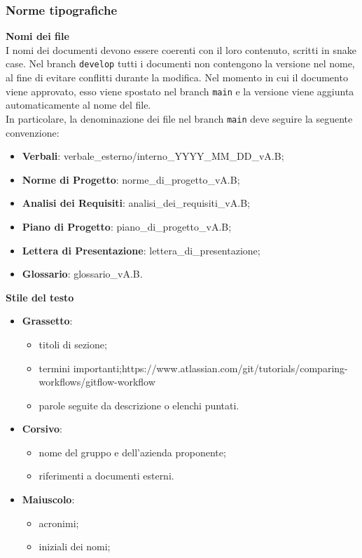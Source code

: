 \subsubsection{Norme tipografiche}
\textbf{Nomi dei file}\\ I nomi dei documenti devono essere coerenti con il loro contenuto,
scritti in snake case. Nel branch \texttt{develop} tutti i documenti non contengono la versione nel nome, al fine di evitare conflitti durante la modifica.
Nel momento in cui il documento viene approvato, esso viene spostato nel branch \texttt{main} e la versione viene aggiunta automaticamente al nome del file.\\
In particolare, la denominazione dei file nel branch \texttt{main} deve seguire la seguente convenzione:
\begin{itemize}
	\item \textbf{Verbali}: verbale\_esterno/interno\_YYYY\_MM\_DD\_vA.B;
	\item \textbf{Norme di Progetto}: norme\_di\_progetto\_vA.B;
	\item \textbf{Analisi dei Requisiti}: analisi\_dei\_requisiti\_vA.B;
	\item \textbf{Piano di Progetto}: piano\_di\_progetto\_vA.B;
	\item \textbf{Lettera di Presentazione}: lettera\_di\_presentazione;
	\item \textbf{Glossario}: glossario\_vA.B.
\end{itemize}
\textbf{Stile del testo}
\begin{itemize}
	\item \textbf{Grassetto}:
	      \begin{itemize}
		      \item titoli di sezione;
		      \item termini importanti;https://www.atlassian.com/git/tutorials/comparing-workflows/gitflow-workflow
		      \item parole seguite da descrizione o elenchi puntati.
	      \end{itemize}
	\item \textbf{Corsivo}:
	      \begin{itemize}
		      \item nome del gruppo e dell'azienda proponente;
		      \item riferimenti a documenti esterni.
	      \end{itemize}
	\item \textbf{Maiuscolo}:
	      \begin{itemize}
		      \item acronimi;
		      \item iniziali dei nomi;
	      \end{itemize}
\end{itemize}
